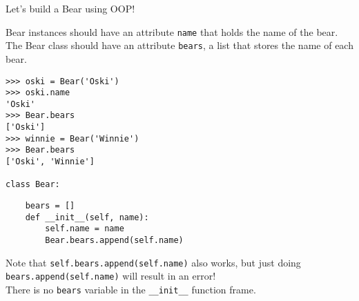 \begin{blocksection}
\question Let's build a Bear using OOP!

Bear instances should have an attribute \lstinline{name} that holds the name of the bear.
The Bear class should have an attribute \lstinline{bears}, a list that stores the name of each bear.
\vspace{1\baselineskip}
\begin{lstlisting}
>>> oski = Bear('Oski')
>>> oski.name
'Oski'
>>> Bear.bears
['Oski']
>>> winnie = Bear('Winnie')
>>> Bear.bears
['Oski', 'Winnie']

class Bear:
\end{lstlisting}

\begin{nonsol}
\vspace{4\baselineskip}
\end{nonsol}

\begin{solution}
  \vspace{-0.5\baselineskip}
\begin{lstlisting}
    bears = []
    def __init__(self, name):
        self.name = name
        Bear.bears.append(self.name)
\end{lstlisting}

Note that \lstinline{self.bears.append(self.name)} also works, but just doing \lstinline{bears.append(self.name)} will result in an error!
\\There is no \lstinline{bears} variable in the \lstinline{__init__} function frame.
\end{solution}
\end{blocksection}